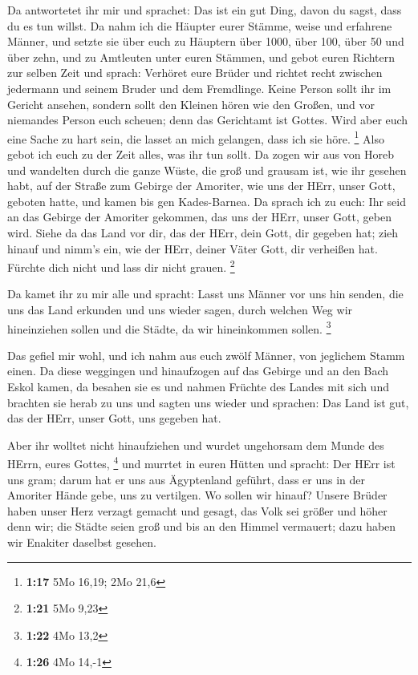  Da antwortetet ihr mir und sprachet: Das ist ein gut Ding,
davon du sagst, dass du es tun willst.  Da nahm ich die
Häupter eurer Stämme, weise und erfahrene Männer, und setzte sie über
euch zu Häuptern über 1000, über 100, über 50 und über zehn, und zu
Amtleuten unter euren Stämmen,  und gebot euren Richtern
zur selben Zeit und sprach: Verhöret eure Brüder und richtet recht
zwischen jedermann und seinem Bruder und dem Fremdlinge. 
Keine Person sollt ihr im Gericht ansehen, sondern sollt den Kleinen
hören wie den Großen, und vor niemandes Person euch scheuen; denn das
Gerichtamt ist Gottes. Wird aber euch eine Sache zu hart sein, die
lasset an mich gelangen, dass ich sie höre. \footnote{\textbf{1:17} 5Mo
  16,19; 2Mo 21,6}  Also gebot ich euch zu der Zeit alles,
was ihr tun sollt.  Da zogen wir aus von Horeb und
wandelten durch die ganze Wüste, die groß und grausam ist, wie ihr
gesehen habt, auf der Straße zum Gebirge der Amoriter, wie uns der HErr,
unser Gott, geboten hatte, und kamen bis gen Kades-Barnea. 
Da sprach ich zu euch: Ihr seid an das Gebirge der Amoriter gekommen,
das uns der HErr, unser Gott, geben wird.  Siehe da das
Land vor dir, das der HErr, dein Gott, dir gegeben hat; zieh hinauf und
nimm's ein, wie der HErr, deiner Väter Gott, dir verheißen hat. Fürchte
dich nicht und lass dir nicht grauen. \footnote{\textbf{1:21} 5Mo 9,23}

 Da kamet ihr zu mir alle und spracht: Lasst uns Männer vor
uns hin senden, die uns das Land erkunden und uns wieder sagen, durch
welchen Weg wir hineinziehen sollen und die Städte, da wir hineinkommen
sollen. \footnote{\textbf{1:22} 4Mo 13,2}

 Das gefiel mir wohl, und ich nahm aus euch zwölf Männer,
von jeglichem Stamm einen.  Da diese weggingen und
hinaufzogen auf das Gebirge und an den Bach Eskol kamen, da besahen sie
es  und nahmen Früchte des Landes mit sich und brachten sie
herab zu uns und sagten uns wieder und sprachen: Das Land ist gut, das
der HErr, unser Gott, uns gegeben hat.

 Aber ihr wolltet nicht hinaufziehen und wurdet ungehorsam
dem Munde des HErrn, eures Gottes, \footnote{\textbf{1:26} 4Mo 14,-1}
 und murrtet in euren Hütten und spracht: Der HErr ist uns
gram; darum hat er uns aus Ägyptenland geführt, dass er uns in der
Amoriter Hände gebe, uns zu vertilgen.  Wo sollen wir
hinauf? Unsere Brüder haben unser Herz verzagt gemacht und gesagt, das
Volk sei größer und höher denn wir; die Städte seien groß und bis an den
Himmel vermauert; dazu haben wir Enakiter daselbst gesehen.

